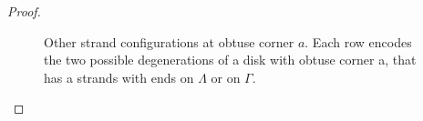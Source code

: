 \documentclass[10pt,a4paper]{amsart}
\begin{document}
\begin{proof}
\begin{figure}[h]
\begin{tikzpicture}[x=0.65pt,y=0.65pt,yscale=-1,xscale=1]
\end{tikzpicture}

        \caption{Other strand configurations at obtuse corner $a$. Each row encodes the two possible degenerations of a disk with obtuse corner a, that has a strands with ends on $\Lambda$ or on $\Gamma$.}
        \label{fig:decomp 3}
    \end{figure}

\end{proof}
\end{document}
